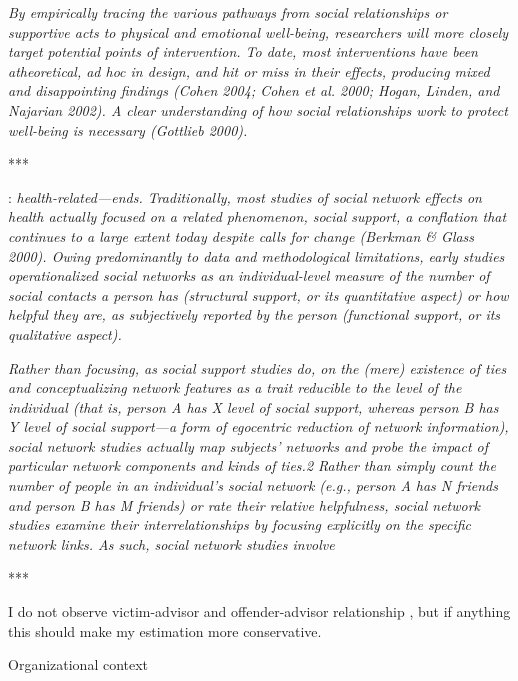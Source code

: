 \documentclass[]{article}
\begin{document}
\textit{By empirically tracing the various pathways from  social relationships or supportive acts to physical and emotional well-being, researchers will more closely target potential points of intervention. To date, most interventions have been atheoretical, ad hoc in design, and hit or miss in their effects, producing mixed and disappointing findings (Cohen 2004; Cohen et al. 2000; Hogan, Linden, and Najarian 2002). A clear understanding of how social relationships work to protect well-being is necessary (Gottlieb 2000).}

***


\cite{smith2008social}: 
\textit{health-related—ends.  Traditionally, most studies of social network effects on health actually focused on a related phenomenon, social support, a conflation that continues to a large extent today despite calls for change (Berkman \& Glass 2000). Owing predominantly to data and methodological limitations, early studies operationalized social networks as an individual-level measure of the number of social contacts a person has (structural support, or its quantitative aspect) or how helpful they are, as subjectively reported by the person (functional support, or its qualitative aspect).}

\textit{Rather than focusing, as social support studies do, on the (mere) existence of ties and conceptualizing network features as a trait reducible to the level of the individual (that is, person A has X level of social support, whereas person B has Y level of social support—a form of egocentric reduction of network information), social network studies actually map subjects’ networks and probe the impact of particular network components and kinds of ties.2 Rather than simply count the number of people in an individual’s social network (e.g., person A has N friends and person B has M friends) or rate their relative helpfulness, social network studies examine their interrelationships by focusing explicitly on the specific network links. As such, social network studies involve}

***

I do not observe victim-advisor and offender-advisor relationship \citep{knoth2019reporting}, but if anything this should make my estimation more conservative. 


	
	
	Organizational context \citep{goudriaan2004reporting, garofalo1987school, collins1987job}
	
\end{document}
